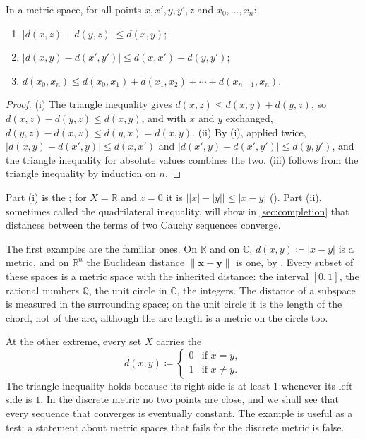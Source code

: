 \begin{proposition}
\label{prop:metric-inequalities}
In a metric space, for all points $x,x',y,y',z$ and $x_0,\ldots,x_n$:
\begin{enumerate}
\item $|d(x,z)-d(y,z)|\le d(x,y)$;
\item $|d(x,y)-d(x',y')|\le d(x,x')+d(y,y')$;
\item $d(x_0,x_n)\le d(x_0,x_1)+d(x_1,x_2)+\cdots+d(x_{n-1},x_n)$.
\end{enumerate}
\end{proposition}

\begin{proof}
(i) The triangle inequality gives $d(x,z)\le d(x,y)+d(y,z)$, so $d(x,z)-d(y,z)\le d(x,y)$, and with $x$ and $y$ exchanged, $d(y,z)-d(x,z)\le d(y,x)=d(x,y)$. (ii) By (i), applied twice, $|d(x,y)-d(x',y)|\le d(x,x')$ and $|d(x',y)-d(x',y')|\le d(y,y')$, and the triangle inequality for absolute values combines the two. (iii) follows from the triangle inequality by induction on $n$.
\end{proof}

Part (i) is the ; for $X=\mathbb R$ and $z=0$ it is $\bigl||x|-|y|\bigr|\le|x-y|$ (). Part (ii), sometimes called the quadrilateral inequality, will show in \cref{sec:completion} that distances between the terms of two Cauchy sequences converge.

The first examples are the familiar ones. On $\mathbb R$ and on $\mathbb C$, $d(x,y)\coloneqq|x-y|$ is a metric, and on $\mathbb R^n$ the Euclidean distance $\|\mathbf x-\mathbf y\|$ is one, by . Every subset of these spaces is a metric space with the inherited distance: the interval $[0,1]$, the rational numbers $\mathbb Q$, the unit circle in $\mathbb C$, the integers. The distance of a subspace is measured in the surrounding space; on the unit circle it is the length of the chord, not of the arc, although the arc length is a metric on the circle too.

At the other extreme, every set $X$ carries the 
\[
d(x,y)\coloneqq\begin{cases}0&\text{if }x=y,\\1&\text{if }x\ne y.\end{cases}
\]
The triangle inequality holds because its right side is at least $1$ whenever its left side is $1$. In the discrete metric no two points are close, and we shall see that every sequence that converges is eventually constant. The example is useful as a test: a statement about metric spaces that fails for the discrete metric is false.

